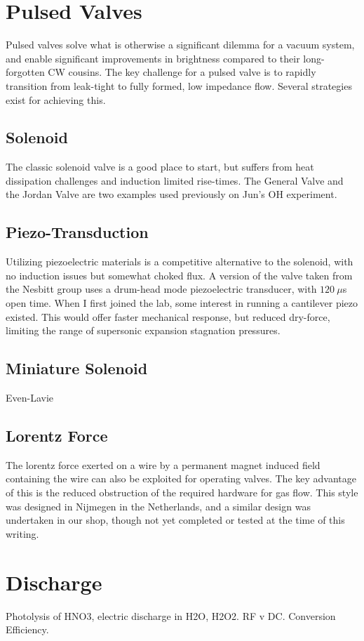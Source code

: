 \section{Pulsed Valves}

Pulsed valves solve what is otherwise a significant dilemma for a vacuum system, and enable significant improvements in brightness compared to their long-forgotten CW cousins.
The key challenge for a pulsed valve is to rapidly transition from leak-tight to fully formed, low impedance flow.
Several strategies exist for achieving this.

\subsection{Solenoid}

The classic solenoid valve is a good place to start, but suffers from heat dissipation challenges and induction limited rise-times.
The General Valve and the Jordan Valve are two examples used previously on Jun's OH experiment.

\subsection{Piezo-Transduction}

Utilizing piezoelectric materials is a competitive alternative to the solenoid, with no induction issues but somewhat choked flux.
A version of the valve taken from the Nesbitt group uses a drum-head mode piezoelectric transducer, with $120~\mu$s open time.
When I first joined the lab, some interest in running a cantilever piezo existed.
This would offer faster mechanical response, but reduced dry-force, limiting the range of supersonic expansion stagnation pressures.

\subsection{Miniature Solenoid}

Even-Lavie

\subsection{Lorentz Force}

The lorentz force exerted on a wire by a permanent magnet induced field containing the wire can also be exploited for operating valves.
The key advantage of this is the reduced obstruction of the required hardware for gas flow.
This style was designed in Nijmegen in the Netherlands, and a similar design was undertaken in our shop, though not yet completed or tested at the time of this writing.

\section{Discharge}\label{secdisch}

Photolysis of HNO3, electric discharge in H2O, H2O2. RF v DC. Conversion Efficiency.





\ifx\justbeingincluded\undefined

\fi
